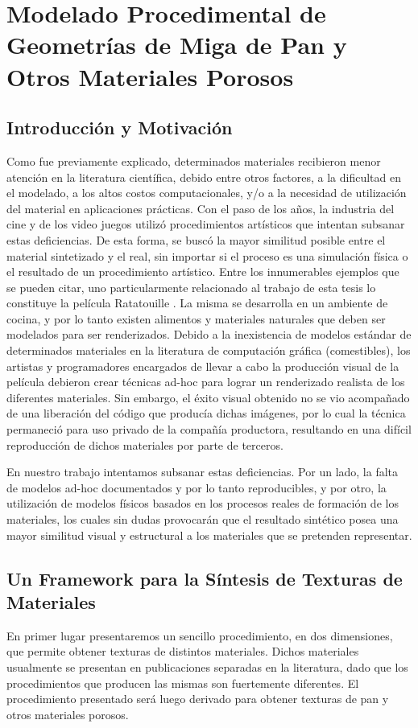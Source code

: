 \chapter[Modelado de la Geometría de Miga de Pan]{Modelado Procedimental de Geometrías de Miga de Pan y Otros Materiales Porosos}

\section{Introducción y Motivación} %
Como fue previamente explicado, determinados materiales recibieron menor atención en la literatura científica, debido entre otros factores, a la dificultad en el modelado, a los altos costos computacionales, y/o a la necesidad de utilización del material en aplicaciones prácticas.
Con el paso de los a\~nos, la industria del cine y de los video juegos utilizó procedimientos artísticos que intentan subsanar estas deficiencias.
De esta forma, se busc\'o la mayor similitud posible entre el material sintetizado y el real, sin importar si el proceso es una simulación física o el resultado de un procedimiento artístico.
Entre los innumerables ejemplos que se pueden citar, uno particularmente relacionado al trabajo de esta tesis lo constituye la película Ratatouille \cite{Cho2007}.
La misma se desarrolla en un ambiente de cocina, y por lo tanto existen alimentos y materiales naturales que deben ser modelados para ser renderizados.
Debido a la inexistencia de modelos estándar de determinados materiales en la literatura de computación gráfica (comestibles), los artistas y programadores encargados de llevar a cabo la producción visual de la película debieron crear técnicas ad-hoc para lograr un renderizado realista de los diferentes materiales.
Sin embargo, el éxito visual obtenido no se vio acompañado de una liberación del código que producía dichas imágenes, por lo cual la técnica permaneció para uso privado de la compañía productora, resultando en una difícil reproducción de dichos materiales por parte de terceros.

En nuestro trabajo intentamos subsanar estas deficiencias.
Por un lado, la falta de modelos ad-hoc documentados y por lo tanto reproducibles, y por otro, la utilización de modelos físicos basados en los procesos reales de formación de los materiales, los cuales sin dudas provocarán que el resultado sintético posea una mayor similitud visual y estructural a los materiales que se pretenden representar.

\section{Un Framework para la Síntesis de Texturas de Materiales}
En primer lugar presentaremos un sencillo procedimiento, en dos dimensiones, que permite obtener texturas de distintos materiales.
Dichos materiales usualmente se presentan en publicaciones separadas en la literatura, dado que los procedimientos que producen las mismas son fuertemente diferentes.
El procedimiento presentado ser\'a luego derivado para obtener texturas de pan y otros materiales porosos.

